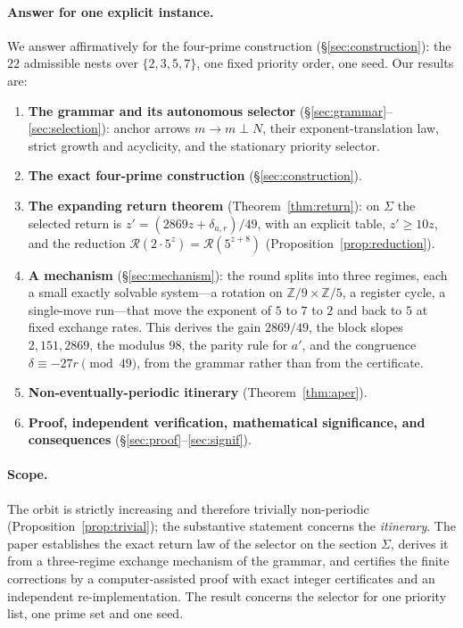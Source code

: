 \documentclass[11pt,a4paper]{article}
\theoremstyle{definition}
\newcommand{\nest}{\mathbin{\perp}}
\newcommand{\Sig}{\Sigma}
\newcommand{\Ret}{\mathcal{R}}
\begin{document}
\paragraph{Answer for one explicit instance.} We answer affirmatively for the four-prime construction (\S\ref{sec:construction}): the $22$ admissible nests over $\{2,3,5,7\}$, one fixed priority order, one seed. Our results are:
\begin{enumerate}[label=(\arabic*)]
\item \textbf{The grammar and its autonomous selector} (\S\ref{sec:grammar}--\ref{sec:selection}): anchor arrows $m\to m\nest N$, their exponent-translation law, strict growth and acyclicity, and the stationary priority selector.
\item \textbf{The exact four-prime construction} (\S\ref{sec:construction}).
\item \textbf{The expanding return theorem} (Theorem~\ref{thm:return}): on $\Sig$ the selected return is $z'=(2869z+\delta_{a,r})/49$, with an explicit table, $z'\ge10z$, and the reduction $\Ret(2\cdot5^z)=\Ret(5^{z+8})$ (Proposition~\ref{prop:reduction}).
\item \textbf{A mechanism} (\S\ref{sec:mechanism}): the round splits into three regimes, each a small exactly solvable system---a rotation on $\mathbb{Z}/9\times\mathbb{Z}/5$, a register cycle, a single-move run---that move the exponent of $5$ to $7$ to $2$ and back to $5$ at fixed exchange rates. This derives the gain $2869/49$, the block slopes $2,151,2869$, the modulus $98$, the parity rule for $a'$, and the congruence $\delta\equiv-27r\pmod{49}$, from the grammar rather than from the certificate.
\item \textbf{Non-eventually-periodic itinerary} (Theorem~\ref{thm:aper}).
\item \textbf{Proof, independent verification, mathematical significance, and consequences} (\S\ref{sec:proof}--\ref{sec:signif}).
\end{enumerate}

\paragraph{Scope.} The orbit is strictly increasing and therefore trivially non-periodic (Proposition~\ref{prop:trivial}); the substantive statement concerns the \emph{itinerary}. The paper establishes the exact return law of the selector on the section $\Sig$, derives it from a three-regime exchange mechanism of the grammar, and certifies the finite corrections by a computer-assisted proof with exact integer certificates and an independent re-implementation. The result concerns the selector for one priority list, one prime set and one seed.
\end{document}
